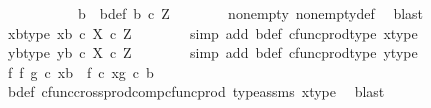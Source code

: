 \begin{isabellebody}
\ \ \isamarkupfalse%
\ {\isacharminus}{\kern0pt}\ \isanewline
\ \ \ \ \isamarkupfalse%
\ b\ \ b{\isacharunderscore}{\kern0pt}def{\isacharcolon}{\kern0pt}\ {\isachardoublequoteopen}b\ {\isasymin}\isactrlsub c\ Z{\isachardoublequoteclose}\isanewline
\ \ \ \ \ \ \isamarkupfalse%
\ nonempty{\isacharparenleft}{\kern0pt}{}{\isacharparenright}{\kern0pt}\ nonempty{\isacharunderscore}{\kern0pt}def\ \isamarkupfalse%
\ blast\isanewline
\isanewline
\ \ \ \ \isamarkupfalse%
\ xb{\isacharunderscore}{\kern0pt}type{\isacharcolon}{\kern0pt}\ {\isachardoublequoteopen}{\isasymlangle}x{\isacharcomma}{\kern0pt}b{\isasymrangle}\ {\isasymin}\isactrlsub c\ X\ {\isasymtimes}\isactrlsub c\ Z{\isachardoublequoteclose}\isanewline
\ \ \ \ \ \ \isamarkupfalse%
\ {\isacharparenleft}{\kern0pt}simp\ add{\isacharcolon}{\kern0pt}\ b{\isacharunderscore}{\kern0pt}def\ cfunc{\isacharunderscore}{\kern0pt}prod{\isacharunderscore}{\kern0pt}type\ x{\isacharunderscore}{\kern0pt}type{}{\isacharparenright}{\kern0pt}\isanewline
\ \ \ \ \isamarkupfalse%
\ yb{\isacharunderscore}{\kern0pt}type{\isacharcolon}{\kern0pt}\ {\isachardoublequoteopen}{\isasymlangle}y{\isacharcomma}{\kern0pt}b{\isasymrangle}\ {\isasymin}\isactrlsub c\ X\ {\isasymtimes}\isactrlsub c\ Z{\isachardoublequoteclose}\isanewline
\ \ \ \ \ \ \isamarkupfalse%
\ {\isacharparenleft}{\kern0pt}simp\ add{\isacharcolon}{\kern0pt}\ b{\isacharunderscore}{\kern0pt}def\ cfunc{\isacharunderscore}{\kern0pt}prod{\isacharunderscore}{\kern0pt}type\ y{\isacharunderscore}{\kern0pt}type{}{\isacharparenright}{\kern0pt}\isanewline
\ \ \ \ \isamarkupfalse%
\ {\isachardoublequoteopen}{\isacharparenleft}{\kern0pt}f\ {\isasymtimes}\isactrlsub f\ g{\isacharparenright}{\kern0pt}\ {\isasymcirc}\isactrlsub c\ {\isasymlangle}x{\isacharcomma}{\kern0pt}b{\isasymrangle}\ {\isacharequal}{\kern0pt}\ {\isasymlangle}f\ {\isasymcirc}\isactrlsub c\ x{\isacharcomma}{\kern0pt}g\ {\isasymcirc}\isactrlsub c\ b{\isasymrangle}{\isachardoublequoteclose}\isanewline
\ \ \ \ \ \ \isamarkupfalse%
\ b{\isacharunderscore}{\kern0pt}def\ cfunc{\isacharunderscore}{\kern0pt}cross{\isacharunderscore}{\kern0pt}prod{\isacharunderscore}{\kern0pt}comp{\isacharunderscore}{\kern0pt}cfunc{\isacharunderscore}{\kern0pt}prod\ type{\isacharunderscore}{\kern0pt}assms\ x{\isacharunderscore}{\kern0pt}type{}\ \isamarkupfalse%
\ blast\isanewline
\ \ \ \ \isamarkupfalse%

\end{isabellebody}
